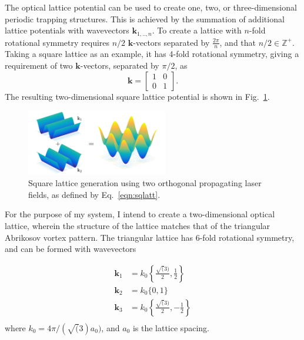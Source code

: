The optical lattice potential can be used to create one, two, or three-dimensional periodic trapping structures. This is achieved by the summation of additional lattice potentials with wavevectors $\mathbf{k}_{1,..,n}$. To create a lattice with $n$-fold rotational symmetry requires $n/2$ $\mathbf{k}$-vectors separated by $\frac{2\pi}{n}$, and that $n/2 \in \mathbb{Z}^{+}$. Taking a square lattice as an example, it has 4-fold rotational symmetry, giving a requirement of two $\mathbf{k}$-vectors, separated by $\pi/2$, as
\begin{equation}
    \mathbf{k} =
    \begin{bmatrix}
     1 & 0 \\
     0 & 1
    \end{bmatrix}.\label{eqn:sqlatt}
\end{equation}
The resulting two-dimensional square lattice potential is shown in Fig.~\ref{fig:cos2xy}.
\begin{figure}[tb]\centering
    \includegraphics[width=0.55\textwidth]{./Images/ch4_vtx/VOPT/squarelatt}
    \caption{Square lattice generation using two orthogonal propagating laser fields, as defined by Eq.~\ref{eqn:sqlatt}.}\label{fig:cos2xy}
\end{figure}

For the purpose of my system, I intend to create a two-dimensional optical lattice, wherein the structure of the lattice matches that of the triangular Abrikosov vortex pattern. The triangular lattice has 6-fold rotational symmetry, and can be formed with wavevectors

\begin{subequations}
    \begin{align}
        \mathbf{k}_1 &= k_0\left\{\frac{\sqrt(3)}{2},\frac{1}{2}\right\} \\
        \mathbf{k}_2 &= k_0\{0,1\} \\
        \mathbf{k}_3 &= k_0\left\{\frac{\sqrt(3)}{2},-\frac{1}{2}\right\} \\
    \end{align}
\end{subequations}
where $k_0 = 4\pi/(\sqrt(3)a_0)$, and $a_0$ is the lattice spacing.

